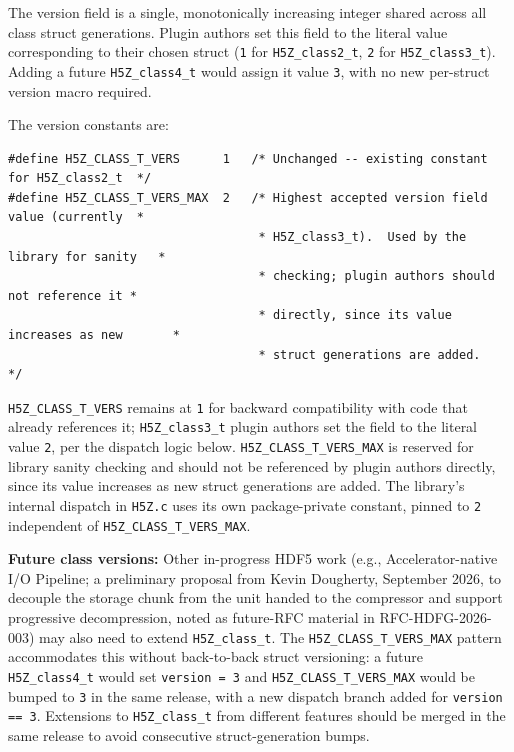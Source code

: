 \documentclass[../RFC-HDFG-2026-001.tex]{subfiles}
\begin{document}
The version field is a single, monotonically increasing integer shared
across all class struct generations.  Plugin authors set this field to the
literal value corresponding to their chosen struct (\texttt{1} for
\texttt{H5Z\_class2\_t}, \texttt{2} for \texttt{H5Z\_class3\_t}).  Adding a
future \texttt{H5Z\_class4\_t} would assign it value \texttt{3}, with no new
per-struct version macro required.

The version constants are:

\begin{verbatim}
#define H5Z_CLASS_T_VERS      1   /* Unchanged -- existing constant for H5Z_class2_t  */
#define H5Z_CLASS_T_VERS_MAX  2   /* Highest accepted version field value (currently  *
                                   * H5Z_class3_t).  Used by the library for sanity   *
                                   * checking; plugin authors should not reference it *
                                   * directly, since its value increases as new       *
                                   * struct generations are added.                    */
\end{verbatim}

\texttt{H5Z\_CLASS\_T\_VERS} remains at \texttt{1} for backward compatibility
with code that already references it; \texttt{H5Z\_class3\_t} plugin authors
set the field to the literal value \texttt{2}, per the dispatch logic below.
\texttt{H5Z\_CLASS\_T\_VERS\_MAX} is reserved for library sanity checking and
should not be referenced by plugin authors directly, since its value increases as
new struct generations are added. The library's internal dispatch in
\texttt{H5Z.c} uses its own package-private constant, pinned to \texttt{2}
independent of \texttt{H5Z\_CLASS\_T\_VERS\_MAX}.

\textbf{Future class versions:} Other in-progress HDF5 work (e.g.,
Accelerator-native I/O Pipeline; a preliminary proposal from Kevin
Dougherty, September 2026, to decouple the storage chunk from the unit
handed to the compressor and support progressive decompression, noted as
future-RFC material in RFC-HDFG-2026-003) may also need to extend
\texttt{H5Z\_class\_t}.  The \texttt{H5Z\_CLASS\_T\_VERS\_MAX} pattern
accommodates this without back-to-back struct versioning: a future
\texttt{H5Z\_class4\_t} would set \texttt{version = 3} and
\texttt{H5Z\_CLASS\_T\_VERS\_MAX} would be bumped to \texttt{3} in the same
release, with a new dispatch branch added for \texttt{version == 3}.
Extensions to \texttt{H5Z\_class\_t} from different features should be
merged in the same release to avoid consecutive struct-generation bumps.
\end{document}
